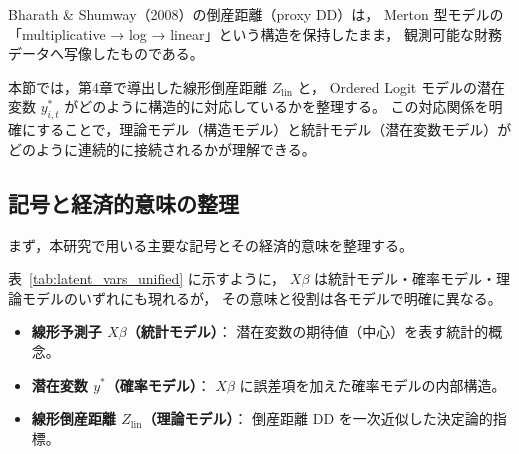 Bharath \& Shumway（2008）の倒産距離（proxy DD）は，
Merton 型モデルの「multiplicative → log → linear」という構造を保持したまま，
観測可能な財務データへ写像したものである。

本節では，第4章で導出した線形倒産距離 $Z_{\text{lin}}$ と，
Ordered Logit モデルの潜在変数 $y^*_{i,t}$ がどのように構造的に対応しているかを整理する。
この対応関係を明確にすることで，理論モデル（構造モデル）と統計モデル（潜在変数モデル）が
どのように連続的に接続されるかが理解できる。


\subsection{記号と経済的意味の整理}

まず，本研究で用いる主要な記号とその経済的意味を整理する。

\begin{table}[H]
\centering
\caption{潜在変数／倒産距離／閾値の記号整理}
\label{tab:latent_vars_unified}
\end{table}


表~\ref{tab:latent_vars_unified} に示すように，
$X\beta$ は統計モデル・確率モデル・理論モデルのいずれにも現れるが，
その意味と役割は各モデルで明確に異なる。


\begin{itemize}
    \item \textbf{線形予測子 $X\beta$（統計モデル）}：  
    潜在変数の期待値（中心）を表す統計的概念。
    \item \textbf{潜在変数 $y^*$（確率モデル）}：  
    $X\beta$ に誤差項を加えた確率モデルの内部構造。
    \item \textbf{線形倒産距離 $Z_{\text{lin}}$（理論モデル）}：  
    倒産距離 DD を一次近似した決定論的指標。
\end{itemize}

